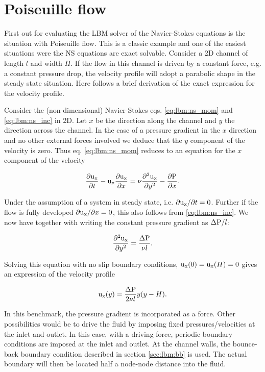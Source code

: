 \section{Poiseuille flow}
First out for evaluating the LBM solver of the Navier-Stokes equations
is the situation with Poiseuille flow. This is a classic example and
one of the easiest situations were the NS equations are exact
solvable. Consider a 2D channel of length $l$ and width $H$. If the
flow in this channel is driven by a constant force, e.g. a constant
pressure drop, the velocity profile will adopt a parabolic shape in
the steady state situation. Here follows a brief derivation of the
exact expression for the velocity profile.

Consider the (non-dimensional) Navier-Stokes
eqs. \eqref{eq:lbm:ns_mom} and \eqref{eq:lbm:ns_inc} in
2D. Let $x$ be the direction along the channel and $y$ the direction
across the channel. In the case of a pressure gradient in the $x$
direction and no other external forces involved we deduce that the $y$
component of the velocity is zero. Thus eq. \eqref{eq:lbm:ns_mom}
reduces to an equation for the $x$ component of the velocity

\begin{equation}
\dfrac{\partial \mathrm{u_x}}{\partial t} - \mathrm{u_x} \dfrac{\partial \mathrm{u_x}}{\partial
  x} = \nu \dfrac{\partial^2 \mathrm{u_x}}{\partial y^2} -
\dfrac{\partial \mathrm{P}}{\partial x}.
\end{equation}
 
Under the assumption of a system in steady state, i.e. ${\partial
  \mathrm{u_x}}/{\partial t} = 0$. Further if the flow is fully developed
${\partial \mathrm{u_x}}/{\partial x} = 0$, this also follows from
\eqref{eq:lbm:ns_inc}. We now have together
with writing the constant pressure gradient as $\Delta \mathrm{P}/l$:

\begin{equation}
\dfrac{\partial^2 \mathrm{u_x}}{\partial y^2} =
\dfrac{\Delta\mathrm{P}}{\nu l}.
\end{equation}

Solving this equation with no slip boundary conditions, $\mathrm{u_x}(0) = \mathrm{u_x}(H) =
0$ gives an expression of the velocity profile

\begin{equation}\label{eq:mb:ana_poi}
\mathrm{u_x}(y) = \dfrac{\Delta\mathrm{P}}{2\nu l}y(y - H).
\end{equation}

In this benchmark, the pressure gradient is incorporated as a
force. Other possibilities would be to drive the fluid by imposing
fixed pressures/velocities at the inlet and outlet.  In this case,
with a driving force, periodic boundary conditions are imposed at the
inlet and outlet. At the channel walls, the bounce-back boundary
condition described in section \ref{sec:lbm:bb} is used. The actual
boundary will then be located half a node-node distance into the
fluid.

